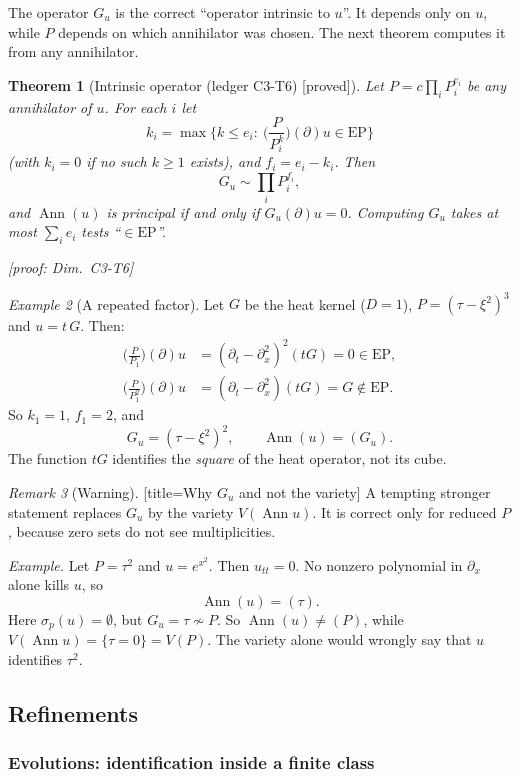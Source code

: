 \documentclass[11pt]{article}
\theoremstyle{plain}
\newtheorem{theorem}{Theorem}[section]
\theoremstyle{definition}
\theoremstyle{remark}
\newtheorem{remark}[theorem]{Remark}
\newtheorem{example}[theorem]{Example}
\DeclareMathOperator{\Ann}{Ann}             %
\newcommand{\Var}{V}                        %
\newcommand{\EP}{\mathrm{EP}}               %
\newcommand{\badge}[2]{\textcolor{#1}{\textsf{\footnotesize[#2]}}}
\newcommand{\proved}[1][]{\badge{cC}{proved#1}}
\newcommand{\led}[1]{\textcolor{cG}{\textsf{\footnotesize(ledger #1)}}}
\newenvironment{caution}{\begin{remark}[Warning]}{\end{remark}}
\newcommand{\dimref}[1]{\textsf{\footnotesize[proof: Dim.~#1]}}
\begin{document}
The operator $G_u$ is the correct ``operator intrinsic to $u$''. It depends only on $u$, while $P$ depends on which annihilator was chosen. The next theorem computes it from any annihilator.

\begin{theorem}[{Intrinsic operator \led{C3-T6} \proved}]\label{thm:intrinsic}
Let $P=c\prod_iP_i^{e_i}$ be any annihilator of $u$. For each $i$ let
\[
k_i=\max\Big\{k\le e_i:\ \Big(\frac{P}{P_i^{k}}\Big)(\partial)u\in\EP\Big\}
\]
(with $k_i=0$ if no such $k\ge1$ exists), and $f_i=e_i-k_i$. Then
\[
G_u\sim\prod_iP_i^{f_i},
\]
and $\Ann(u)$ is principal if and only if $G_u(\partial)u=0$. Computing $G_u$ takes at most $\sum_ie_i$ tests ``$\in\EP$''.

\dimref{C3-T6}
\end{theorem}

\begin{example}[{A repeated factor}]
Let $G$ be the heat kernel ($D=1$), $P=(\tau-\xi^2)^3$ and $u=t\,G$. Then:
\begin{align*}
\Big(\frac{P}{P_1}\Big)(\partial)u&=(\partial_t-\partial_x^2)^2(tG)=0\in\EP,\\
\Big(\frac{P}{P_1^2}\Big)(\partial)u&=(\partial_t-\partial_x^2)(tG)=G\notin\EP .
\end{align*}
So $k_1=1$, $f_1=2$, and
\[
G_u=(\tau-\xi^2)^2,\qquad \Ann(u)=(G_u).
\]
The function $tG$ identifies the \emph{square} of the heat operator, not its cube.
\end{example}

\begin{caution}[title={Why $G_u$ and not the variety}]
A tempting stronger statement replaces $G_u$ by the variety $\Var(\Ann u)$. It is correct only for reduced $P$, because zero sets do not see multiplicities.

\emph{Example.} Let $P=\tau^2$ and $u=e^{x^2}$. Then $u_{tt}=0$. No nonzero polynomial in $\partial_x$ alone kills $u$, so
\[
\Ann(u)=(\tau).
\]
Here $\sigma_p(u)=\emptyset$, but $G_u=\tau\not\sim P$. So $\Ann(u)\ne(P)$, while $\Var(\Ann u)=\{\tau=0\}=\Var(P)$. The variety alone would wrongly say that $u$ identifies $\tau^2$.
\end{caution}

\subsection{Refinements}

\subsubsection{Evolutions: identification inside a finite class}
\end{document}
